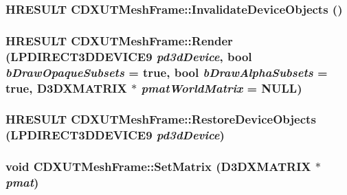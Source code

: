 \label{class_c_d_x_u_t_mesh_frame_a64ed732741542d6111824d2101dd6374}
\hypertarget{class_c_d_x_u_t_mesh_frame_a1c1963f6cbf1808f4fe6be9a3c73e7a8}{
\subsubsection[{InvalidateDeviceObjects}]{\setlength{\rightskip}{0pt plus 5cm}HRESULT CDXUTMeshFrame::InvalidateDeviceObjects ()}}
\label{class_c_d_x_u_t_mesh_frame_a1c1963f6cbf1808f4fe6be9a3c73e7a8}
\hypertarget{class_c_d_x_u_t_mesh_frame_aed74e59459faea4616e2af4300a38131}{
\subsubsection[{Render}]{\setlength{\rightskip}{0pt plus 5cm}HRESULT CDXUTMeshFrame::Render (LPDIRECT3DDEVICE9 {\em pd3dDevice}, \/  bool {\em bDrawOpaqueSubsets} = {\ttfamily true}, \/  bool {\em bDrawAlphaSubsets} = {\ttfamily true}, \/  D3DXMATRIX $\ast$ {\em pmatWorldMatrix} = {\ttfamily NULL})}}
\label{class_c_d_x_u_t_mesh_frame_aed74e59459faea4616e2af4300a38131}
\hypertarget{class_c_d_x_u_t_mesh_frame_adb3aba293444d69cf6b60f9b85ed1258}{
\subsubsection[{RestoreDeviceObjects}]{\setlength{\rightskip}{0pt plus 5cm}HRESULT CDXUTMeshFrame::RestoreDeviceObjects (LPDIRECT3DDEVICE9 {\em pd3dDevice})}}
\label{class_c_d_x_u_t_mesh_frame_adb3aba293444d69cf6b60f9b85ed1258}
\hypertarget{class_c_d_x_u_t_mesh_frame_ad526c0fecb1d600a4c6597e4f62331b6}{
\subsubsection[{SetMatrix}]{\setlength{\rightskip}{0pt plus 5cm}void CDXUTMeshFrame::SetMatrix (D3DXMATRIX $\ast$ {\em pmat})}}
\label{class_c_d_x_u_t_mesh_frame_ad526c0fecb1d600a4c6597e4f62331b6}


